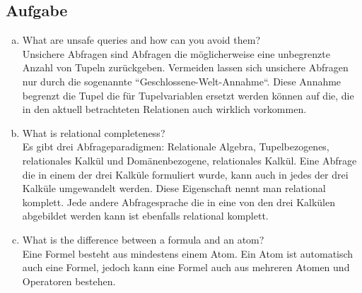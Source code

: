 \documentclass[11pt,a4paper,DIV=9]{scrartcl}
\newcounter{temp}
\newcommand{\aufgabe}[1]{
  \setcounter{temp}{\value{subsection}}
  \setcounter{subsection}{#1}
  \addtocounter{subsection}{-1}
  \subsection{Aufgabe}
  \setcounter{subsection}{\value{temp}}
}
\begin{document}
\aufgabe{3}
\begin{enumerate}[a)]
 \item What are unsafe queries and how can you avoid them? \\
 Unsichere Abfragen sind Abfragen die m\"oglicherweise eine unbegrenzte Anzahl von Tupeln zur\"uckgeben. Vermeiden lassen sich unsichere Abfragen nur durch die sogenannte ``Geschlossene-Welt-Annahme``. Diese Annahme begrenzt die Tupel die f\"ur Tupelvariablen ersetzt werden k\"onnen auf die, die in den aktuell betrachteten Relationen auch wirklich vorkommen.
 \item What is relational completeness? \\
 Es gibt drei Abfrageparadigmen: Relationale Algebra, Tupelbezogenes, relationales Kalk\"ul und Dom\"anenbezogene, relationales Kalk\"ul. Eine Abfrage die in einem der drei Kalk\"ule formuliert wurde, kann auch in jedes der drei Kalk\"ule umgewandelt werden. Diese Eigenschaft nennt man relational komplett. Jede andere Abfragesprache die in eine von den drei Kalk\"ulen abgebildet werden kann ist ebenfalls relational komplett.
 \item What is the difference between a formula and an atom? \\
 Eine Formel besteht aus mindestens einem Atom. Ein Atom ist automatisch auch eine Formel, jedoch kann eine Formel auch aus mehreren Atomen und Operatoren bestehen.
\end{enumerate}
\end{document}

